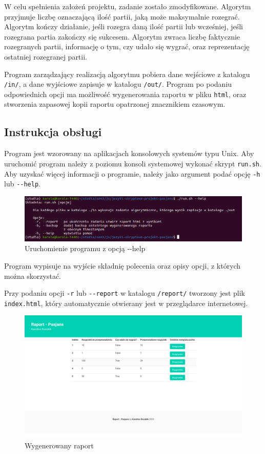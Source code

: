 \documentclass[12pt,a4paper]{article}
\begin{document}
W celu spełnienia założeń projektu, zadanie zostało zmodyfikowane. Algorytm przyjmuje liczbę oznaczającą ilość partii, jaką może maksymalnie rozegrać. Algorytm kończy działanie, jeśli rozegra daną ilość partii lub wcześniej, jeśli rozegrana partia zakończy się sukcesem. Algorytm zwraca liczbę faktycznie rozegranych partii, informację o tym, czy udało się wygrać, oraz reprezentację ostatniej rozegranej partii.

Program zarządzający realizacją algorytmu pobiera dane wejściowe z katalogu \texttt{/in/}, a dane wyjściowe zapisuje w katalogu \texttt{/out/}. Program po podaniu odpowiednich opcji ma możliwość wygenerowania raportu w pliku \texttt{html}, oraz stworzenia zapasowej kopii raportu opatrzonej znacznikiem czasowym.

\newpage

\subsection*{Instrukcja obsługi}
Program jest wzorowany na aplikacjach konsolowych systemów typu Unix. Aby uruchomić program należy z poziomu konsoli systemowej wykonać skrypt \texttt{run.sh}. Aby uzyskać więcej informacji o programie, należy jako argument podać opcję \texttt{-h} lub \texttt{-{}-help}.

\begin{figure}[h]
    \centering
    \includegraphics[width=0.75\linewidth]{program-help.png}
    \caption{Uruchomienie programu z opcją -{}-help}
    \label{fig:program-help}
\end{figure}

Program wypisuje na wyjście składnię polecenia oraz opisy opcji, z których można skorzystać. 

Przy podaniu opcji \texttt{-r} lub \texttt{-{}-report} w katalogu \texttt{/report/} tworzony jest plik \texttt{index.html}, który automatycznie otwierany jest w przeglądarce internetowej.

\begin{figure}[h]
    \centering
    \includegraphics[width=0.75\linewidth]{raport.png}
    \caption{Wygenerowany raport}
    \label{fig:raport}
\end{figure}
\end{document}
